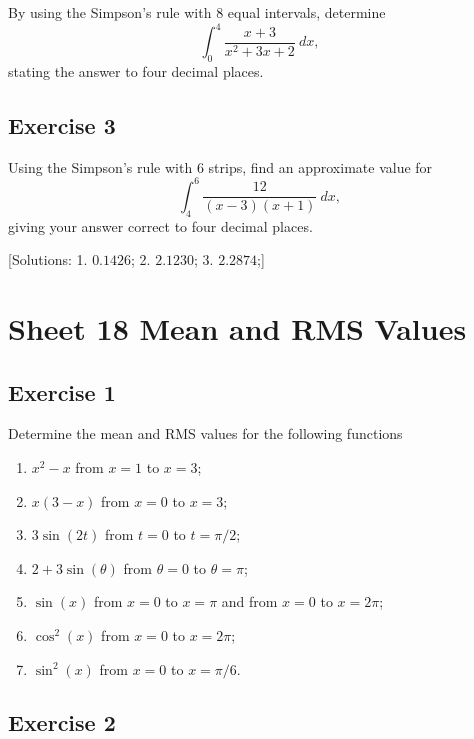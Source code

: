 \documentclass[
  11pt,
  oneside]{book}
\providecommand{\tightlist}{%
  \setlength{\itemsep}{0pt}\setlength{\parskip}{0pt}}
\newcommand{\slide}{}
\theoremstyle{definition}
\theoremstyle{definition}
\theoremstyle{definition}
\theoremstyle{definition}
\theoremstyle{remark}
\begin{document}
By using the Simpson's rule with 8 equal intervals, determine
\[
\int_0^4\frac{x+3}{x^2+3x+2}\ dx,
\]
stating the answer to four decimal places.

\slide

\subsection*{Exercise 3}\label{exercise-3-6}

Using the Simpson's rule with 6 strips, find an approximate value for
\[
\int_4^6\frac{12}{(x-3)(x+1)}\ dx,
\]
giving your answer correct to four decimal places.

{[}Solutions:
1. \(0.1426\);
2. \(2.1230\);
3. \(2.2874\);{]}

\slide

\section{Sheet 18 Mean and RMS Values}\label{sheet-18-mean-and-rms-values}

\slide

\subsection*{Exercise 1}\label{exercise-1-9}

Determine the mean and RMS values for the following functions

\begin{enumerate}
\def\labelenumi{\roman{enumi}.}
\tightlist
\item
  \(x^2-x\) from \(x=1\) to \(x=3\);
\item
  \(x(3-x)\) from \(x=0\) to \(x=3\);
\item
  \(3\sin(2t)\) from \(t=0\) to \(t=\pi/2\);
\item
  \(2+3\sin(\theta)\) from \(\theta=0\) to \(\theta=\pi\);
\item
  \(\sin(x)\) from \(x=0\) to \(x=\pi\) and from \(x=0\) to \(x=2\pi\);
\item
  \(\cos^2(x)\) from \(x=0\) to \(x=2\pi\);
\item
  \(\sin^2(x)\) from \(x=0\) to \(x=\pi/6\).
\end{enumerate}

\slide

\subsection*{Exercise 2}\label{exercise-2-9}
\end{document}
